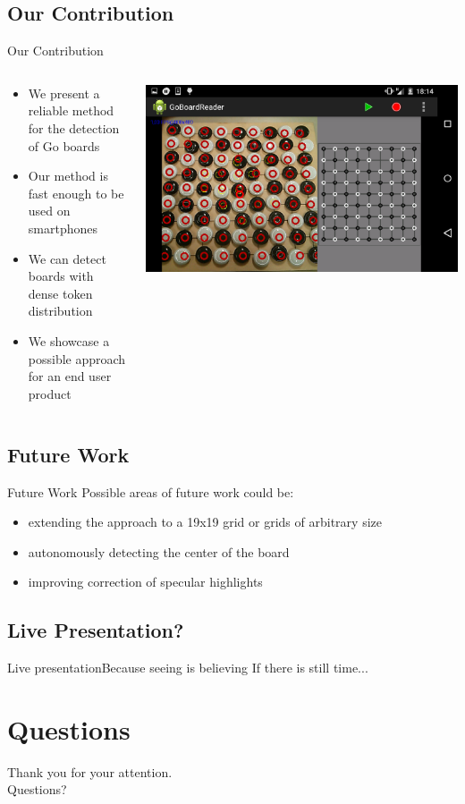 \documentclass[table]{beamer}
\begin{document}
\subsection{Our Contribution}
\begin{frame}{Our Contribution}
	\begin{columns}
		\begin{column}{0.5\textwidth}
			\begin{itemize}
				\item We present a reliable method for the detection of Go boards
				\item Our method is fast enough to be used on smartphones
				\item We can detect boards with dense token distribution
				\item We showcase a possible approach for an end user product
			\end{itemize}
		\end{column}
		\begin{column}{0.4\textwidth}
			\includegraphics[width=\columnwidth]{images/android_perfect_recognition.png}
		\end{column}
	\end{columns}
\end{frame}
\subsection{Future Work}
\begin{frame}{Future Work}
	Possible areas of future work could be:
	\begin{itemize}
		\item extending the approach to a 19x19 grid or grids of arbitrary size
		\item autonomously detecting the center of the board
		\item improving correction of specular highlights
	\end{itemize}
\end{frame}

\subsection{Live Presentation?}
\begin{frame}{Live presentation}{Because seeing is believing}
	\centering
	If there is still time...
\end{frame}

\section*{Questions}
\begin{frame}
	\centering
  \huge Thank you for your attention.\\[1.5cm] Questions?
\end{frame}
\end{document}
